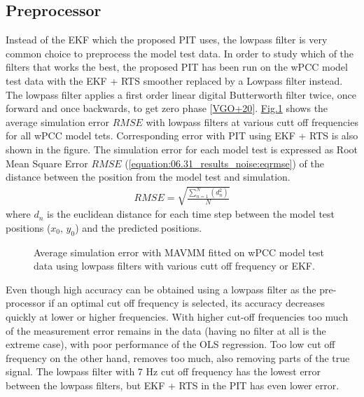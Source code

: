 \documentclass[review]{elsarticle}
\begin{document}
\subsection{Preprocessor}
\label{\detokenize{06.31_results_noise:preprocessor}}\label{\detokenize{06.31_results_noise::doc}}
\sphinxAtStartPar
Instead of the EKF which the proposed PIT uses, the low\sphinxhyphen{}pass filter is very common choice to preprocess the model test data.
In order to study which of the filters that works the best, the proposed PIT has been run on the wPCC model test data with the EKF + RTS smoother replaced by a Low\sphinxhyphen{}pass filter instead. The low\sphinxhyphen{}pass filter applies a first order linear digital Butterworth filter twice, once forward and once backwards, to get zero phase {[}\hyperlink{cite.bibligraphy:id83}{VGO+20}{]}. \hyperref[\detokenize{06.31_results_noise:fig-lowpass-accuracy}]{Fig.\@ \ref{\detokenize{06.31_results_noise:fig-lowpass-accuracy}}} shows the average simulation error \( {RMSE} \) with low\sphinxhyphen{}pass filters at various cutt off frequencies for all wPCC model tets. Corresponding error with PIT using EKF + RTS is also shown in the figure. The simulation error for each model test is expressed as Root Mean Square Error \(RMSE\) (\autoref{equation:06.31_results_noise:eqrmse}) of the distance between the position from the model test and simulation.
\begin{equation}\label{equation:06.31_results_noise:eqrmse}
\begin{split}RMSE=\sqrt{ \frac{\sum_{n=1}^{N} (d_n^2) }{N}} \end{split}
\end{equation}
\sphinxAtStartPar
where \(d_n\) is the euclidean distance for each time step between the model test positions (\(x_0\), \(y_0\)) and the predicted positions.

\begin{figure}[H]
\centering
\capstart

\noindent{}
\caption{Average simulation error with MAVMM fitted on wPCC model test data using low\sphinxhyphen{}pass filters with various cutt off frequency or EKF.}\label{\detokenize{06.31_results_noise:fig-lowpass-accuracy}}\end{figure}

\sphinxAtStartPar
Even though high accuracy can be obtained using a low\sphinxhyphen{}pass filter as the pre-processor if an optimal cut off frequency is selected, its accuracy decreases quickly at lower or higher frequencies. With higher cut-off frequencies too much of the measurement error remains in the data (having no filter at all is the extreme case), with poor performance of the OLS regression. Too low cut off frequency on the other hand, removes too much, also removing parts of the true signal. The low\sphinxhyphen{}pass filter with 7 Hz cut off frequency has the lowest error between the low\sphinxhyphen{}pass filters, but EKF + RTS in the PIT has even lower error.
\end{document}
